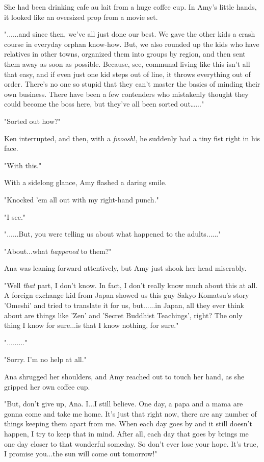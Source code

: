 \documentclass[
]{article}
\begin{document}
She had been drinking cafe au lait from a huge coffee cup. In Amy's
little hands, it looked like an oversized prop from a movie set.

"......and since then, we've all just done our best. We gave the other
kids a crash course in everyday orphan know-how. But, we also rounded up
the kids who have relatives in other towns, organized them into groups
by region, and then sent them away as soon as possible. Because, see,
communal living like this isn't all that easy, and if even just one kid
steps out of line, it throws everything out of order. There's no one so
stupid that they can't master the basics of minding their own business.
There have been a few contenders who mistakenly thought they could
become the boss here, but they've all been sorted out\ldots..."

"Sorted out how?"

Ken interrupted, and then, with a \emph{fwoosh}!, he suddenly had a tiny
fist right in his face.

"With this."

With a sidelong glance, Amy flashed a daring smile.

"Knocked 'em all out with my right-hand punch."

"I see."

"......But, you were telling us about what happened to the adults......"

"About...what \emph{happened} to them?"

Ana was leaning forward attentively, but Amy just shook her head
miserably.

"Well \emph{that} part, I don't know. In fact, I don't really know much
about this at all. A foreign exchange kid from Japan showed us this guy
Sakyo Komatsu's story 'Omeshi' and tried to translate it for us,
but......in Japan, all they ever think about are things like 'Zen' and
'Secret Buddhist Teachings', right? The only thing I know for sure...is
that I know nothing, for sure."

"........."

"Sorry. I'm no help at all."

Ana shrugged her shoulders, and Amy reached out to touch her hand, as
she gripped her own coffee cup.

"But, don't give up, Ana. I...I still believe. One day, a papa and a
mama are gonna come and take me home. It's just that right now, there
are any number of things keeping them apart from me. When each day goes
by and it still doesn't happen, I try to keep that in mind. After all,
each day that goes by brings me one day closer to that wonderful
someday. So don't ever lose your hope. It's true, I promise you...the
sun will come out tomorrow!"
\end{document}
